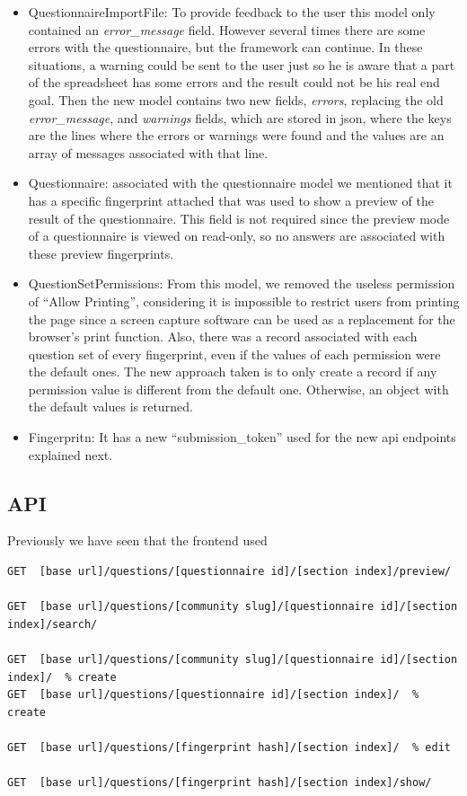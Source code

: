 \begin{itemize}
    \item QuestionnaireImportFile: To provide feedback to the user this model only contained an \textit{error\_message} field.
        However several times there are some errors with the questionnaire, but the framework can continue.
        In these situations, a warning could be sent to the user just so he is aware that a part of the spreadsheet has some errors and the result could not be his real end goal.
        Then the new model contains two new fields, \textit{errors}, replacing the old \textit{error\_message}, and \textit{warnings} fields, which are stored in \gls{json}, where the keys are the lines where the errors or warnings were found and the values are an array of messages associated with that line.
    \item Questionnaire: associated with the questionnaire model we mentioned that it has a specific fingerprint attached that was used to show a preview of the result of the questionnaire.
        This field is not required since the preview mode of a questionnaire is viewed on read-only, so no answers are associated with these preview fingerprints.
    \item QuestionSetPermissions: From this model, we removed the useless permission of ``Allow Printing'', considering it is impossible to restrict users from printing the page since a screen capture software can be used as a replacement for the browser's print function.
        Also, there was a record associated with each question set of every fingerprint, even if the values of each permission were the default ones.
        The new approach taken is to only create a record if any permission value is different from the default one.
        Otherwise, an object with the default values is returned.
    \item Fingerpritn: It has a new ``submission\_token'' used for the new \gls{api} endpoints explained next.
\end{itemize}

\subsection{API}

Previously we have seen that the frontend used 

\begin{lstlisting}[basicstyle=\tiny]
GET  [base url]/questions/[questionnaire id]/[section index]/preview/

GET  [base url]/questions/[community slug]/[questionnaire id]/[section index]/search/

GET  [base url]/questions/[community slug]/[questionnaire id]/[section index]/  % create
GET  [base url]/questions/[questionnaire id]/[section index]/  % create

GET  [base url]/questions/[fingerprint hash]/[section index]/  % edit

GET  [base url]/questions/[fingerprint hash]/[section index]/show/
\end{lstlisting}

